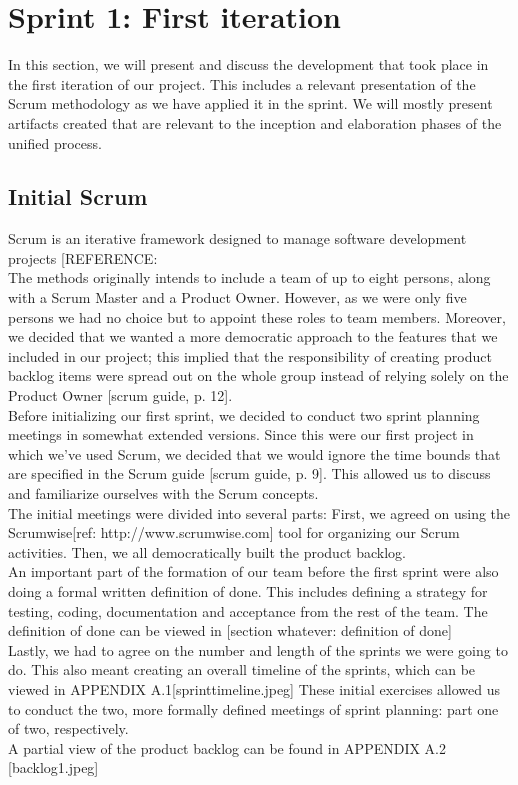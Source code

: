 \section{Sprint 1: First iteration}
In this section, we will present and discuss the development that took place in the first iteration of our project. This includes a relevant presentation of the Scrum methodology as we have applied it in the sprint. We will mostly present artifacts created that are relevant to the inception and elaboration phases of the unified process.
\subsection{Initial Scrum}
Scrum is an iterative framework designed to manage software development projects [REFERENCE:\\ %
The methods originally intends to include a team of up to eight persons, along with a Scrum Master and a Product Owner. However, as we were only five persons we had no choice but to appoint these roles to team members. Moreover, we decided that we wanted a more democratic approach to the features that we included in our project; this implied that the responsibility of creating product backlog items were spread out on the whole group instead of relying solely on the Product Owner [scrum guide, p. 12].\\
\newline
Before initializing our first sprint, we decided to conduct two sprint planning meetings in somewhat extended versions. Since this were our first project in which we’ve used Scrum, we decided that we would ignore the time bounds that are specified in the Scrum guide [scrum guide, p. 9]. This allowed us to discuss and familiarize ourselves with the Scrum concepts.\\
The initial meetings were divided into several parts: First, we agreed on using the Scrumwise[ref: http://www.scrumwise.com] tool for organizing our Scrum activities. Then, we all democratically built the product backlog. \\
An important part of the formation of our team before the first sprint were also doing a formal written definition of done. This includes defining a strategy for testing, coding, documentation and acceptance from the rest of the team. The definition of done can be viewed in [section whatever: definition of done]\\
Lastly, we had to agree on the number and length of the sprints we were going to do. This also meant creating an overall timeline of the sprints, which can be viewed in APPENDIX A.1[sprinttimeline.jpeg]  These initial exercises allowed us to conduct the two, more formally defined meetings of sprint planning: part one of two, respectively. \\
A partial view of the product backlog can be found in APPENDIX A.2 [backlog1.jpeg]\\
